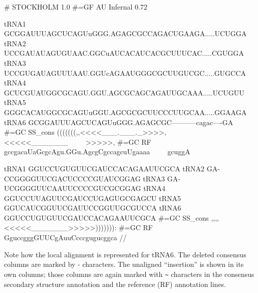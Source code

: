 {\samepage
\begin{sreoutput}
# STOCKHOLM 1.0
#=GF AU    Infernal 0.72

tRNA1             GCGGAUUUAGCUCAGUuGGG.AGAGCGCCAGACUGAAGA.....UCUGGA
tRNA2             UCCGAUAUAGUGUAAC.GGCuAUCACAUCACGCUUUCAC.....CGUGGA
tRNA3             UCCGUGAUAGUUUAAU.GGUcAGAAUGGGCGCUUGUCGC.....GUGCCA
tRNA4             GCUCGUAUGGCGCAGU.GGU.AGCGCAGCAGAUUGCAAA.....UCUGUU
tRNA5             GGGCACAUGGCGCAGUuGGU.AGCGCGCUUCCCUUGCAA.....GGAAGA
tRNA6             GCGGAUUUAGCUCAGUuGGG.AGAGCGC-----------cagac----GA
#=GC SS_cons      (((((((,,<<<<___.___._>>>>,<<<<<_______~~~~~>>>>>,
#=GC RF           gccgacaUaGcgcAgu.GGu.AgcgCgccagcuUgaaaa~~~~~gcuggA

tRNA1             GGUCCUGUGUUCGAUCCACAGAAUUCGCA
tRNA2             GA-CCGGGGUUCGACUCCCCGUAUCGGAG
tRNA3             GA-UCGGGGUUCAAUUCCCCGUCGCGGAG
tRNA4             GGUCCUUAGUUCGAUCCUGAGUGCGAGCU
tRNA5             GGUCAUCGGUUCGAUUCCGGUUGCGUCCA
tRNA6             GGUCCUGUGUUCGAUCCACAGAAUUCGCA
#=GC SS_cons      ,,,,<<<<<_______>>>>>))))))):
#=GC RF           GguccgggGUUCgAuuCcccgugucggca
//
\end{sreoutput}
}

Note how the local alignment is represented for tRNA6. The deleted
consensus columns are marked by - characters. The unaligned
``insertion'' is shown in its own columns; those columns are again
marked with \verb+~+ characters in the consensus secondary structure
annotation and the reference (RF) annotation lines.



